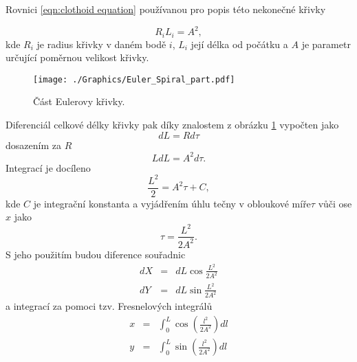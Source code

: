 \documentclass[czech, bc, kky, he, iso690alph]{fasthesis}
\begin{document}
                Rovnici \ref{eqn:clothoid equation} používanou pro popis této nekonečné křivky 
                    
                    \begin{equation}
                        R_{i}L_{i} = A^{2},
                        \label{eqn:clothoid equation}
                    \end{equation}
                 kde \(R_{i}\) je radius křivky v daném bodě \(i\), \(L_{i}\) její délka od počátku a \(A\) je parametr určující poměrnou velikost křivky.
                 	\begin{figure}[h]
                 		\centering
                 		\texttt{[image: ./Graphics/Euler\_Spiral\_part.pdf]}
                 		\caption{Část Eulerovy křivky.}
                 		\label{pic:Eulerova_krivka_cast}
                 	\end{figure}
                 Diferenciál celkové délky křivky pak díky znalostem z obrázku \ref{pic:Eulerova_krivka_cast} vypočten jako
                    \begin{equation}
                        d L = R d\tau
                    \end{equation}
                dosazením za \(R\)
                    \begin{equation}
                        L d L = A^{2}d\tau.
                    \end{equation}
                Integrací je docíleno
                    \begin{equation}
                        \frac{L^{2}}{2} = A^{2}\tau + C,
                    \end{equation}
                kde \(C\) je integrační konstanta a vyjádřením úhlu tečny v obloukové míře\(\tau\) vůči ose \(x\) jako
                    \begin{equation}
                        \tau = \frac{L^{2}}{2A^{2}}.
                    \end{equation}
                S jeho použitím budou diference souřadnic
                    \begin{eqnarray}
                        d X & = & d L\cos{\frac{L^{2}}{2A^{2}}}\\
                        d Y & = & d L\sin{\frac{L^{2}}{2A^{2}}}
                    \end{eqnarray}
                a integrací za pomoci tzv. Fresnelových integrálů
                    \begin{eqnarray}
                        x & = & \int_{0}^{L}\cos(\frac{l^{2}}{2A^{2}})dl\\
                        y & = &\int_{0}^{L}\sin(\frac{l^{2}}{2A^{2}})dl
                    \end{eqnarray}
\end{document}
